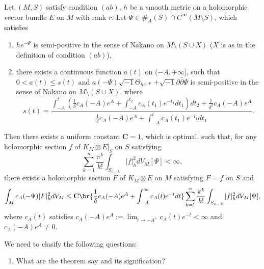 \begin{theorem}
Let $(M,S)$ satisfy condition $(ab)$,
$h$ be a smooth metric on a holomorphic vector bundle $E$ on $M$ with rank $r$.
Let $\Psi\in \#_{A}(S)\cap C^{\infty}(M\setminus S)$, which satisfies

\begin{enumerate}[label=\arabic*)]
  \item $he^{-\Psi}$ is semi-positive in the sense of Nakano on
$M\setminus (S\cup X)$ ($X$ is as in the definition of condition
$(ab)$),
\item there exists a continuous function $a(t)$ on $(-A,+\infty]$,
such that $0<a(t)\leq s(t)$ and
$a(-\Psi)\sqrt{-1}\Theta_{he^{-\Psi}}$ $+\sqrt{-1}\partial\bar\partial\Psi$
is semi-positive in the sense of Nakano on $M\setminus (S\cup X)$,
where $$s(t)=\frac{\int_{-A}^{t}(\frac{1}
{\delta}c_{A}(-A)e^{A}+\int_{-A}^{t_{2}}c_{A}(t_{1})e^{-t_{1}}dt_{1})dt_{2}+\frac{1}{\delta^{2}}c_{A}(-A)e^{A}}
{\frac{1}{\delta}c_{A}(-A)e^{A}+\int_{-A}^{t}c_{A}(t_{1})e^{-t_{1}}dt_{1}}.$$
\end{enumerate}

Then there exists a uniform constant $\mathbf{C}=1$, which is
optimal, such that, for any holomorphic section $f$ of $K_{M}\otimes
E|_{S}$ on $S$ satisfying
\begin{equation}
\label{equ:condition}
\sum_{k=1}^{n}\frac{\pi^{k}}{k!}\int_{S_{n-k}}|f|^{2}_{h}dV_{M}[\Psi]<\infty,
\end{equation}
there
exists a holomorphic section $F$ of $K_{M}\otimes E$ on $M$ satisfying $F = f$ on $ S$ and
\begin{equation}
\label{equ:optimal_delta}
\int_{M}c_{A}(-\Psi)|F|^{2}_{h}dV_{M}
\leq\mathbf{C}\br{\frac{1}{\delta}c_{A}(-A)e^{A}+\int_{-A}^{\infty}c_{A}(t)e^{-t}dt}
\sum_{k=1}^{n}\frac{\pi^{k}}{k!}\int_{S_{n-k}}|f|^{2}_{h}dV_{M}[\Psi],
\end{equation}
where $c_{A}(t)$ satisfies $c_{A}(-A)e^{A}:=\lim_{t\to -A^{+}}c_{A}(t)e^{-t}<\infty$ and $c_{A}(-A)e^{A}\neq0$.
\end{theorem}


\begin{remark}
  We need to clasify the following questions:
  \begin{enumerate}[label=\roman*)]
    \item What are the theorem say and its signification?
  \end{enumerate}
\end{remark}

